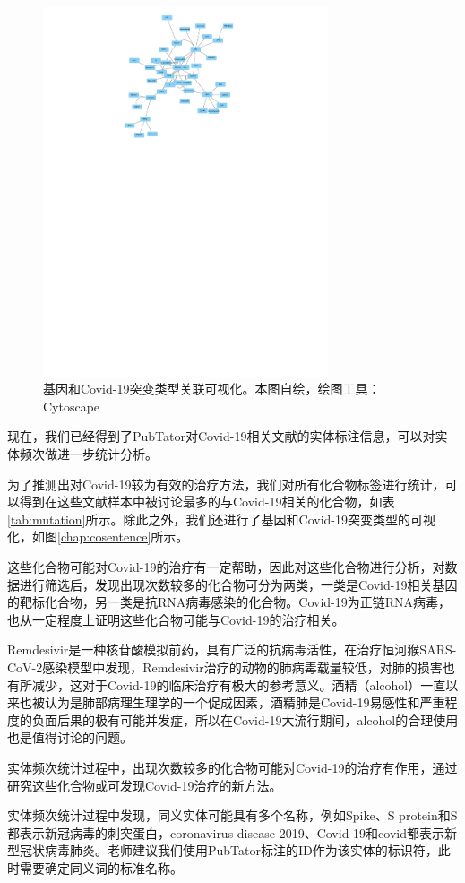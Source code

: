 \documentclass[twocolumn]{article}
\begin{document}
\begin{figure}[ht!]
	\centering
	\includegraphics[width=0.75\textwidth]{figure/gene_chemical.pdf}
	\caption{基因和Covid-19突变类型关联可视化。本图自绘，绘图工具：Cytoscape}
	\label{fig:cosentence}
\end{figure}

现在，我们已经得到了PubTator对Covid-19相关文献的实体标注信息，可以对实体频次做进一步统计分析。\par
为了推测出对Covid-19较为有效的治疗方法，我们对所有化合物标签进行统计，可以得到在这些文献样本中被讨论最多的与Covid-19相关的化合物，如表\ref{tab:mutation}所示。除此之外，我们还进行了基因和Covid-19突变类型的可视化，如图\ref{chap:cosentence}所示。\par
这些化合物可能对Covid-19的治疗有一定帮助，因此对这些化合物进行分析，对数据进行筛选后，发现出现次数较多的化合物可分为两类，一类是Covid-19相关基因的靶标化合物，另一类是抗RNA病毒感染的化合物。Covid-19为正链RNA病毒，也从一定程度上证明这些化合物可能与Covid-19的治疗相关。\par
Remdesivir是一种核苷酸模拟前药，具有广泛的抗病毒活性，在治疗恒河猴SARS-CoV-2感染模型中发现，Remdesivir治疗的动物的肺病毒载量较低，对肺的损害也有所减少\cite{PPR:PPR151409}，这对于Covid-19的临床治疗有极大的参考意义。酒精（alcohol）一直以来也被认为是肺部病理生理学的一个促成因素，酒精肺是Covid-19易感性和严重程度的负面后果的极有可能并发症\cite{BAILEY202111}，所以在Covid-19大流行期间，alcohol的合理使用也是值得讨论的问题。\par
实体频次统计过程中，出现次数较多的化合物可能对Covid-19的治疗有作用，通过研究这些化合物或可发现Covid-19治疗的新方法。\par
实体频次统计过程中发现，同义实体可能具有多个名称，例如Spike、S protein和S都表示新冠病毒的刺突蛋白，coronavirus disease 2019、Covid-19和covid都表示新型冠状病毒肺炎。老师建议我们使用PubTator标注的ID作为该实体的标识符，此时需要确定同义词的标准名称。\par
\end{document}
